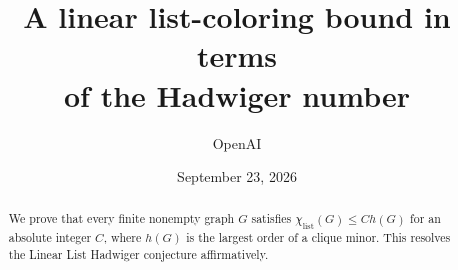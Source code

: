 \documentclass[11pt]{article}
\title{A linear list-coloring bound in terms\\of the Hadwiger number}
\author{OpenAI}
\date{September 23, 2026}
\theoremstyle{definition}
\theoremstyle{remark}
\begin{document}
\maketitle
\begin{abstract}
We prove that every finite nonempty graph $G$ satisfies
$\chi_{\mathrm{list}}(G)\le C h(G)$ for an absolute integer $C$, where
$h(G)$ is the largest order of a clique minor. This resolves the Linear
List Hadwiger conjecture affirmatively.
\end{abstract}










\end{document}
